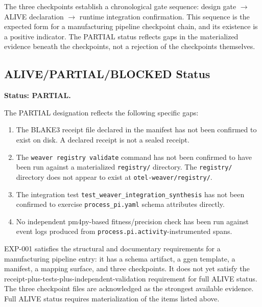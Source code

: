 The three checkpoints establish a chronological gate sequence: design gate $\to$ ALIVE
declaration $\to$ runtime integration confirmation. This sequence is the expected form for a
manufacturing pipeline checkpoint chain, and its existence is a positive indicator. The PARTIAL
status reflects gaps in the materialized evidence beneath the checkpoints, not a rejection of
the checkpoints themselves.

\subsection{ALIVE/PARTIAL/BLOCKED Status}
\label{sec:otel-weaver-exp-001-custom-pi-registry-evidence-status}

\textbf{Status: PARTIAL.}

The PARTIAL designation reflects the following specific gaps:
\begin{enumerate}
  \item The BLAKE3 receipt file declared in the manifest has not been confirmed to exist on disk.
        A declared receipt is not a sealed receipt.
  \item The \texttt{weaver registry validate} command has not been confirmed to have been run
        against a materialized \texttt{registry/} directory. The \texttt{registry/} directory
        does not appear to exist at \texttt{otel-weaver/registry/}.
  \item The integration test \texttt{test\_weaver\_integration\_synthesis} has not been
        confirmed to exercise \texttt{process\_pi.yaml} schema attributes directly.
  \item No independent pm4py-based fitness/precision check has been run against event logs
        produced from \texttt{process.pi.activity}-instrumented spans.
\end{enumerate}

EXP-001 satisfies the structural and documentary requirements for a manufacturing pipeline entry:
it has a schema artifact, a ggen template, a manifest, a mapping surface, and three checkpoints.
It does not yet satisfy the receipt-plus-tests-plus-independent-validation requirement for full
ALIVE status. The three checkpoint files are acknowledged as the strongest available evidence.
Full ALIVE status requires materialization of the items listed above.
